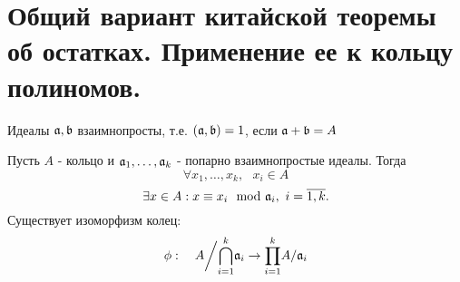 \section{Общий вариант китайской теоремы об остатках. Применение ее к кольцу полиномов.}

\begin{defn}
Идеалы $\mathfrak{a}, \mathfrak{b}$ взаимнопросты, т.е. $(\mathfrak{a}, \mathfrak{b}) = 1$, если $\mathfrak{a} + \mathfrak{b} = A$
\end{defn}

\begin{thm}
Пусть $A$ - кольцо и $\mathfrak{a}_1, \dots, \mathfrak{a}_k$ - попарно взаимнопростые идеалы. Тогда
\[\forall x_1, \dots, x_k, ~~~x_i \in A\]
\[\exists x \in A: x \equiv x_i \mod \Id{a}_i, ~i = \overline{1, k}.\]
Существует изоморфизм колец:
\[\phi:~~~A\bigg/\underset{i = 1}{\overset{k}\bigcap} \mathfrak{a}_i \rightarrow \underset{i = 1}{\overset{k}\prod} A/\mathfrak{a}_i\]
\end{thm}
